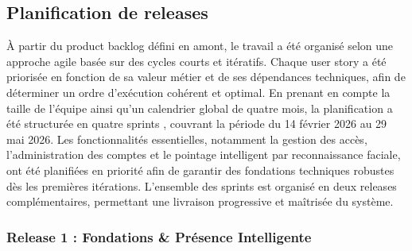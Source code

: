 \begin{center}
\begin{longtable}
\caption{Backlog de produit}
\label{tab:backlog}
\end{longtable}
\end{center}


\subsection{Planification de releases}

À partir du product backlog défini en amont, le travail a été organisé selon une approche agile basée sur des cycles courts et itératifs. Chaque user story a été priorisée en fonction de sa valeur métier et de ses dépendances techniques, afin de déterminer un ordre d’exécution cohérent et optimal. En prenant en compte la taille de l’équipe ainsi qu’un calendrier global de quatre mois, la planification a été structurée en quatre sprints , couvrant la période du 14 février 2026 au 29 mai 2026. Les fonctionnalités essentielles, notamment la gestion des accès, l’administration des comptes et le pointage intelligent par reconnaissance faciale, ont été planifiées en priorité afin de garantir des fondations techniques robustes dès les premières itérations. L’ensemble des sprints est organisé en deux releases complémentaires, permettant une livraison progressive et maîtrisée du système.

\subsubsection*{Release 1 : Fondations \& Présence Intelligente}

